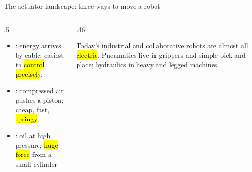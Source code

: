 \documentclass[aspectratio=169,10pt]{beamer}
\begin{document}
\begin{frame}{The actuator landscape: three ways to move a robot}
\vspace{3mm}
\begin{columns}[T]
\begin{column}{.5\textwidth}
\small
\begin{itemize}\setlength\itemsep{2pt}
\item {}: energy arrives by cable; easiest to \hl{control precisely}.
\item {}: compressed air pushes a piston; cheap, fast, \hl{springy}.
\item {}: oil at high pressure; \hl{huge force} from a small cylinder.
\end{itemize}
\end{column}
\begin{column}{.46\textwidth}
\begin{notebox}
\small
Today's industrial and collaborative robots are almost all \hl{electric}. Pneumatics live in grippers and simple pick-and-place; hydraulics in heavy and legged machines.
\end{notebox}
\end{column}
\end{columns}
\end{frame}
\end{document}
